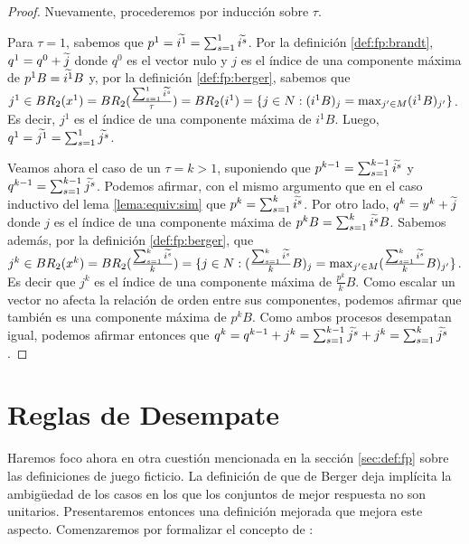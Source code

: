 \begin{proof}
    Nuevamente, procederemos por inducción sobre $\tau$.

    Para $\tau = 1$, sabemos que $p^1 = \widetilde{i^1} = \sum_{s=1}^1{\widetilde{i^s}}$. Por la definición \ref{def:fp:brandt}, $q^1 = q^0 + \widetilde{j}$ donde $q^0$ es el vector nulo y $j$ es el índice de una componente máxima de $p^{1}B = \widetilde{i^1}B$ y, por la definición \ref{def:fp:berger}, sabemos que $j^1 \in BR_2(x^1) = BR_2(\frac{\sum^1_{s=1} \widetilde{i^s}}{\tau}) = BR_2(i^1) = \{j \in N : (i^{1}B)_j = \max_{j' \in M} (i^{1}B)_{j'}\}$. Es decir, $j^1$ es el índice de una componente máxima de $i^{1}B$. Luego, $q^1 = \widetilde{j^1} = \sum_{s=1}^1{\widetilde{j^s}}$.

    Veamos ahora el caso de un $\tau = k > 1$, suponiendo que $p^{k-1} = \sum_{s=1}^{k-1}{\widetilde{i^s}}$ y $q^{k-1} = \sum_{s=1}^{k-1}{\widetilde{j^s}}$. Podemos afirmar, con el mismo argumento que en el caso inductivo del lema \ref{lema:equiv:sim} que $p^{k} = \sum_{s=1}^k{\widetilde{i^s}}$. Por otro lado, $q^{k} = y^{k} + \widetilde{j}$ donde $j$ es el índice de una componente máxima de $p^{k}B = \sum_{s=1}^k{\widetilde{i^s}}B$. Sabemos además, por la definición \ref{def:fp:berger}, que $j^k \in BR_2(x^{k}) = BR_2(\frac{\sum_{s=1}^{k}{\widetilde{i^s}}}{k}) = \{j \in N : (\frac{\sum_{s=1}^{k}{\widetilde{i^s}}}{k}B)_j = \max_{j' \in M} (\frac{\sum_{s=1}^{k}{\widetilde{i^s}}}{k}B)_{j'}\}$. Es decir que $j^k$ es el índice de una componente máxima de $\frac{p^k}{k}B$. Como escalar un vector no afecta la relación de orden entre sus componentes, podemos afirmar que también es una componente máxima de $p^{k}B$. Como ambos procesos desempatan igual, podemos afirmar entonces que $q^k = q^{k-1} + j^k = \sum_{s=1}^{k-1}{\widetilde{j^s}} + j^k = \sum_{s=1}^{k}{\widetilde{j^s}}$.

\end{proof}

\section{Reglas de Desempate}

Haremos foco ahora en otra cuestión mencionada en la sección \ref{sec:def:fp} sobre las definiciones de juego ficticio. La definición de que de Berger deja implícita la ambigüedad de los casos en los que los conjuntos de mejor respuesta no son unitarios. Presentaremos entonces una definición mejorada que mejora este aspecto. Comenzaremos por formalizar el concepto de :


